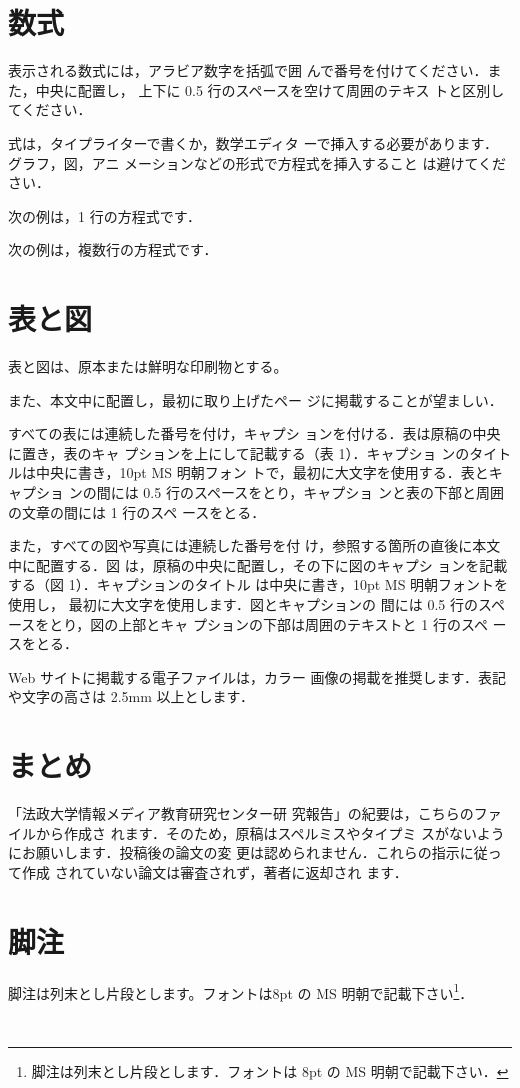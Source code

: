 \documentclass{brccms-hu}
\begin{document}
\section{数式}
表示される数式には，アラビア数字を括弧で囲
んで番号を付けてください．また，中央に配置し，
上下に 0.5 行のスペースを空けて周囲のテキス
トと区別してください．

式は，タイプライターで書くか，数学エディタ
ーで挿入する必要があります．グラフ，図，アニ
メーションなどの形式で方程式を挿入すること
は避けてください．

次の例は，1 行の方程式です．

次の例は，複数行の方程式です．
\section{表と図}
表と図は、原本または鮮明な印刷物とする。

また、本文中に配置し，最初に取り上げたペー
ジに掲載することが望ましい．

すべての表には連続した番号を付け，キャプシ
ョンを付ける．表は原稿の中央に置き，表のキャ
プションを上にして記載する（表 1）．キャプショ
ンのタイトルは中央に書き，10pt MS 明朝フォン
トで，最初に大文字を使用する．表とキャプショ
ンの間には 0.5 行のスペースをとり，キャプショ
ンと表の下部と周囲の文章の間には 1 行のスペ
ースをとる．

また，すべての図や写真には連続した番号を付
け，参照する箇所の直後に本文中に配置する．図
は，原稿の中央に配置し，その下に図のキャプシ
ョンを記載する（図 1）．キャプションのタイトル
は中央に書き，10pt MS 明朝フォントを使用し，
最初に大文字を使用します．図とキャプションの
間には 0.5 行のスペースをとり，図の上部とキャ
プションの下部は周囲のテキストと 1 行のスペ
ースをとる．

Web サイトに掲載する電子ファイルは，カラー
画像の掲載を推奨します．表記や文字の高さは
2.5mm 以上とします．
\section{まとめ}
「法政大学情報メディア教育研究センター研
究報告」の紀要は，こちらのファイルから作成さ
れます．そのため，原稿はスペルミスやタイプミ
スがないようにお願いします．投稿後の論文の変
更は認められません．これらの指示に従って作成
されていない論文は審査されず，著者に返却され
ます．
\section{脚注}
脚注は列末とし片段とします。フォントは8pt
の MS 明朝で記載下さい\footnote{脚注は列末とし片段とします．フォントは 8pt の MS
明朝で記載下さい．}．
\begin{table}[htb]
\caption{}
\ecaption{}
\centering
\begin{tabular}{ll}
\hline
%
\hline
\end{tabular}
\end{table}
\end{document}
